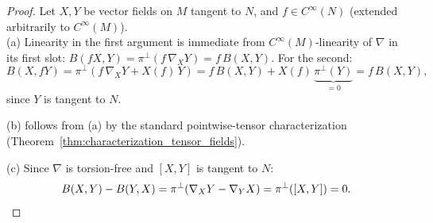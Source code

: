 \begin{proof}
Let $X, Y$ be vector fields on $M$ tangent to $N$, and $f \in C^\infty(N)$ (extended arbitrarily to $C^\infty(M)$).\\

(a) Linearity in the first argument is immediate from $C^\infty(M)$-linearity of $\nabla$ in its first slot: $B(fX, Y) = \pi^\perp(f\,\nabla_X Y) = f\, B(X, Y)$. For the second:
\[
B(X, fY) = \pi^\perp\!\left(f\,\nabla_X Y + X(f)\, Y\right) = f\, B(X, Y) + X(f)\,\underbrace{\pi^\perp(Y)}_{= 0} = f\, B(X, Y),
\]
since $Y$ is tangent to $N$. 

(b) follows from (a) by the standard pointwise-tensor characterization (Theorem~\ref{thm:characterization_tensor_fields}).

(c) Since $\nabla$ is torsion-free and $[X, Y]$ is tangent to $N$:
\[
B(X, Y) - B(Y, X) = \pi^\perp(\nabla_X Y - \nabla_Y X) = \pi^\perp([X, Y]) = 0. \qedhere
\]
\end{proof}







